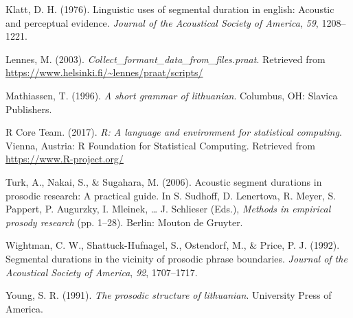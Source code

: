 \documentclass[english,man]{apa6}
\theoremstyle{definition}
\theoremstyle{definition}
\theoremstyle{definition}
\theoremstyle{remark}
\begin{document}
\hypertarget{ref-Klatt76}{}
Klatt, D. H. (1976). Linguistic uses of segmental duration in english:
Acoustic and perceptual evidence. \emph{Journal of the Acoustical
Society of America}, \emph{59}, 1208--1221.

\hypertarget{ref-Lennes03}{}
Lennes, M. (2003). \emph{Collect\_formant\_data\_from\_files.praat}.
Retrieved from \url{https://www.helsinki.fi/~lennes/praat/scripts/}

\hypertarget{ref-Mathiassen96}{}
Mathiassen, T. (1996). \emph{A short grammar of lithuanian}. Columbus,
OH: Slavica Publishers.

\hypertarget{ref-R-base}{}
R Core Team. (2017). \emph{R: A language and environment for statistical
computing}. Vienna, Austria: R Foundation for Statistical Computing.
Retrieved from \url{https://www.R-project.org/}

\hypertarget{ref-Turketal06}{}
Turk, A., Nakai, S., \& Sugahara, M. (2006). Acoustic segment durations
in prosodic research: A practical guide. In S. Sudhoff, D. Lenertova, R.
Meyer, S. Pappert, P. Augurzky, I. Mleinek, \ldots{} J. Schlieser
(Eds.), \emph{Methods in empirical prosody research} (pp. 1--28).
Berlin: Mouton de Gruyter.

\hypertarget{ref-Wightmanetal92}{}
Wightman, C. W., Shattuck-Hufnagel, S., Ostendorf, M., \& Price, P. J.
(1992). Segmental durations in the vicinity of prosodic phrase
boundaries. \emph{Journal of the Acoustical Society of America},
\emph{92}, 1707--1717.

\hypertarget{ref-Young91}{}
Young, S. R. (1991). \emph{The prosodic structure of lithuanian}.
University Press of America.
\end{document}
